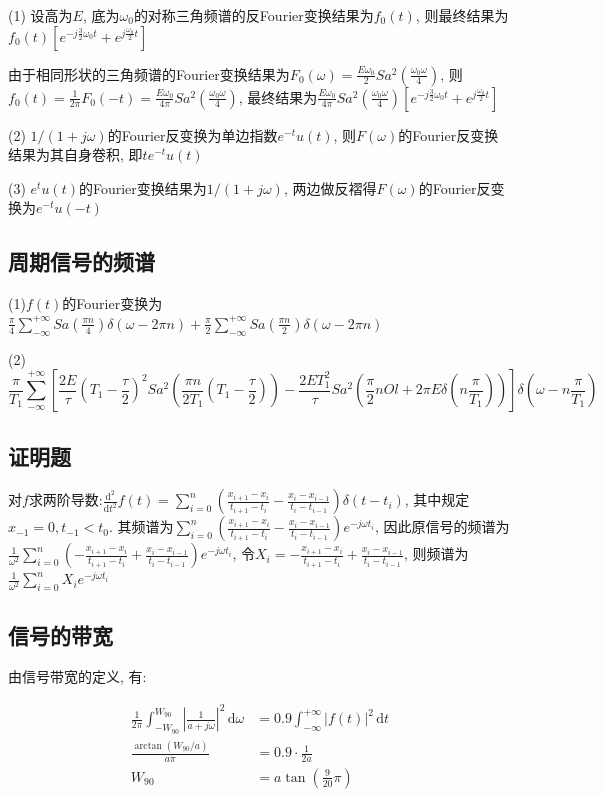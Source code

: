 
(1) 设高为$E$, 底为$\omega_0$的对称三角频谱的反Fourier变换结果为$f_0(t)$, 则最终结果为$f_0(t)[e^{-j\frac{3}{2}\omega_0t}+e^{j\frac{\omega_0}{2}t}]$

由于相同形状的三角频谱的Fourier变换结果为$F_0(\omega)=\frac{E\omega_0}{2}Sa^2(\frac{\omega_0\omega}{4})$, 则$f_0(t)=\frac{1}{2\pi}F_0(-t)=\frac{E\omega_0}{4\pi}Sa^2(\frac{\omega_0\omega}{4})$, 最终结果为$\frac{E\omega_0}{4\pi}Sa^2(\frac{\omega_0\omega}{4})[e^{-j\frac{3}{2}\omega_0t}+e^{j\frac{\omega_0}{2}t}]$

(2) $1/(1+j\omega)$的Fourier反变换为单边指数$e^{-t}u(t)$, 则$F(\omega)$的Fourier反变换结果为其自身卷积, 即$te^{-t}u(t)$

(3) $e^tu(t)$的Fourier变换结果为$1/(1+j\omega)$, 两边做反褶得$F(\omega)$的Fourier反变换为$e^{-t}u(-t)$

\subsection{周期信号的频谱}


(1)$f(t)$的Fourier变换为$\displaystyle\frac{\pi}{4}\sum_{-\infty}^{+\infty}Sa(\frac{\pi n}{4})\delta(\omega-2\pi n)+\frac{\pi}{2}\sum_{-\infty}^{+\infty}Sa(\frac{\pi n}{2})\delta(\omega-2\pi n)$

(2) $$\frac{\pi}{T_1}\sum_{-\infty}^{+\infty}[\frac{2E}{\tau}(T_1-\frac{\tau}{2})^2Sa^2(\frac{\pi n}{2T_1}(T_1-\frac{\tau}{2}))-
\frac{2ET_1^2}{\tau}Sa^2(\frac{\pi}{2}nOl+2\pi E\delta(n\frac{\pi}{T_1}))]\delta(\omega-n\frac{\pi}{T_1})$$

\subsection{证明题}


对$f$求两阶导数:$\displaystyle\frac{\mathrm{d}^2}{\mathrm{d}t^2}f(t)=\sum_{i=0}^{n}(\frac{x_{i+1}-x_{i}}{t_{i+1}-t_i}-\frac{x_i-x_{i-1}}{t_i-t_{i-1}})\delta(t-t_i)$, 其中规定$x_{-1}=0,t_{-1}<t_0$. 其频谱为$\displaystyle\sum_{i=0}^{n}(\frac{x_{i+1}-x_{i}}{t_{i+1}-t_i}-\frac{x_i-x_{i-1}}{t_i-t_{i-1}})e^{-j\omega t_i}$, 因此原信号的频谱为$\displaystyle\frac{1}{\omega^2}\sum_{i=0}^{n}(-\frac{x_{i+1}-x_{i}}{t_{i+1}-t_i}+\frac{x_i-x_{i-1}}{t_i-t_{i-1}})e^{-j\omega t_i}$, 令$X_i=\displaystyle -\frac{x_{i+1}-x_{i}}{t_{i+1}-t_i}+\frac{x_i-x_{i-1}}{t_i-t_{i-1}}$, 则频谱为$\displaystyle\frac{1}{\omega^2}\sum_{i=0}^{n}X_ie^{-j\omega t_i}$

\subsection{信号的带宽}

由信号带宽的定义, 有:

\begin{align*}
    \frac{1}{2\pi}\int_{-W_{90}}^{W_{90}}\left|\frac{1}{a+j\omega}\right|^2\,\mathrm{d}\omega&=0.9\int_{-\infty}^{+\infty}|f(t)|^2\,\mathrm{d}t \\
    \frac{\arctan(W_{90}/a)}{a\pi}&=0.9\cdot\frac{1}{2a} \\
    W_{90}&=a\tan\left(\frac{9}{20}\pi\right)
\end{align*}
